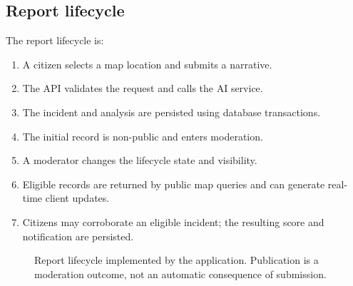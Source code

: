 \documentclass[11pt]{article}
\begin{document}
\subsection{Report lifecycle}

The report lifecycle is:
\begin{enumerate}
  \item A citizen selects a map location and submits a narrative.
  \item The API validates the request and calls the AI service.
  \item The incident and analysis are persisted using database transactions.
  \item The initial record is non-public and enters moderation.
  \item A moderator changes the lifecycle state and visibility.
  \item Eligible records are returned by public map queries and can generate
  real-time client updates.
  \item Citizens may corroborate an eligible incident; the resulting score
  and notification are persisted.
\end{enumerate}

\begin{figure}[H]
\centering
{}
\caption{Report lifecycle implemented by the application. Publication is a moderation outcome, not an automatic consequence of submission.}
\label{fig:lifecycle}
\end{figure}
\end{document}
